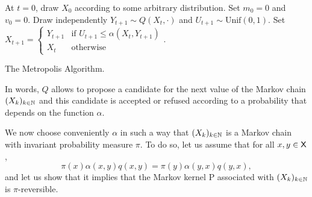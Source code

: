 \documentclass[english,graybox,envcountchap,envcountsame,sectrefs,shortlabels]{svmono}
\theoremstyle{style}
\begin{document}
\begin{algorithm}
\centering
\begin{algorithmic}
\State At $t=0$, draw $X_{0}$ according to some arbitrary distribution.
\State Set $m_{0} = 0$ and $v_{0} = 0$.
\State Draw independently $Y_{t+1}\sim Q(X_{t},\cdot)$ and $U_{t+1}\sim\mathrm{Unif}(0,1)$.
\State Set $X_{t+1}=\begin{cases} Y_{t+1} & \mbox{if }U_{t+1}\leq\alpha(X_{t},Y_{t+1})\\ X_{t} & \mbox{otherwise} \end{cases}$. 
\EndFor
\end{algorithmic}
\caption{The Metropolis Algorithm.}
\label{alg:ùh}
\end{algorithm}

 In words, $Q$ allows to propose a candidate for the next value of
the Markov chain $(X_{k})_{k\in\mathbb{N}}$ and this candidate is accepted or
refused according to a probability that depends on the function $\alpha$.

We now choose conveniently $\alpha$ in such a way that $(X_{k})_{k\in\mathbb{N}}$
is a Markov chain with invariant probability measure $\pi$. To do so, let us assume that
for all $x,y\in\mathsf{X}$,
\begin{equation}
\pi(x)\alpha(x,y)q(x,y)=\pi(y)\alpha(y,x)q(y,x),\label{eq:balance}
\end{equation}
and let us show that it implies that the Markov kernel P associated
with $(X_{k})_{k\in\mathbb{N}}$ is $\pi$-reversible.
\end{document}
